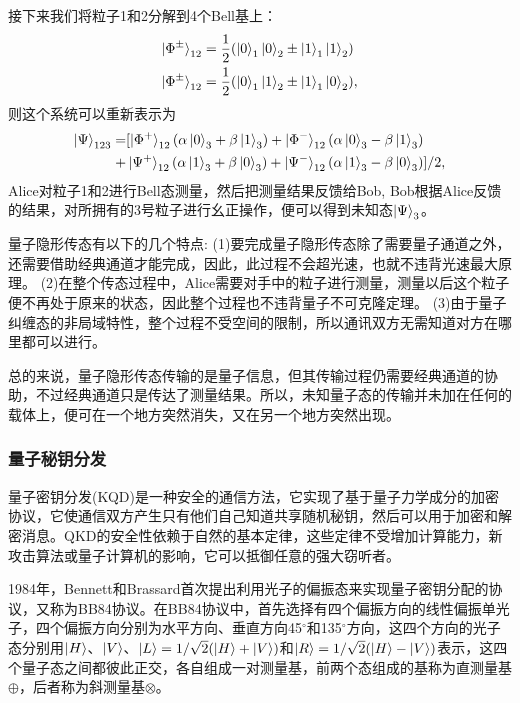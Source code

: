 接下来我们将粒子1和2分解到4个Bell基上：
\begin{equation}
\begin{aligned} 
\ket{\Phi^{\pm}}_{12}&=\frac12(\ket{0}_1\ket{0}_2\pm\ket{1}_1\ket{1}_2)\\
\ket{\Phi^{\pm}}_{12}&=\frac12(\ket{0}_1\ket{1}_2\pm\ket{1}_1\ket{0}_2),
\end{aligned}
\end{equation}
则这个系统可以重新表示为
\begin{equation}
\begin{aligned} 
\ket{\Psi}_{123}=&[\ket{\Phi^{+}}_{12}(\alpha\ket{0}_3+\beta\ket{1}_3)+\ket{\Phi^{-}}_{12}(\alpha\ket{0}_3-\beta\ket{1}_3)\\
                     +&  \ket{\Psi^{+}}_{12}(\alpha\ket{1}_3+\beta\ket{0}_3)+\ket{\Psi^{-}}_{12}(\alpha\ket{1}_3-\beta\ket{0}_3)]/2,
\end{aligned}
\end{equation}
Alice对粒子1和2进行Bell态测量，然后把测量结果反馈给Bob,  Bob根据Alice反馈的结果，对所拥有的3号粒子进行幺正操作，便可以得到未知态$\ket{\Psi}_3$。

量子隐形传态有以下的几个特点:
(1)要完成量子隐形传态除了需要量子通道之外，还需要借助经典通道才能完成，因此，此过程不会超光速，也就不违背光速最大原理。
(2)在整个传态过程中，Alice需要对手中的粒子进行测量，测量以后这个粒子便不再处于原来的状态，因此整个过程也不违背量子不可克隆定理。
(3)由于量子纠缠态的非局域特性，整个过程不受空间的限制，所以通讯双方无需知道对方在哪里都可以进行。

总的来说，量子隐形传态传输的是量子信息，但其传输过程仍需要经典通道的协助，不过经典通道只是传达了测量结果。所以，未知量子态的传输并未加在任何的载体上，便可在一个地方突然消失，又在另一个地方突然出现。
\subsubsection{量子秘钥分发}
量子密钥分发(KQD)是一种安全的通信方法，它实现了基于量子力学成分的加密协议，它使通信双方产生只有他们自己知道共享随机秘钥，然后可以用于加密和解密消息。QKD的安全性依赖于自然的基本定律，这些定律不受增加计算能力，新攻击算法或量子计算机的影响，它可以抵御任意的强大窃听者。

1984年，Bennett和Brassard首次提出利用光子的偏振态来实现量子密钥分配的协议，又称为BB84协议\cite{bennett1984brassard}。在BB84协议中，首先选择有四个偏振方向的线性偏振单光子，四个偏振方向分别为水平方向、垂直方向45$^{\circ}$和135$^{\circ}$方向，这四个方向的光子态分别用$\ket{H}$、$\ket{V}$、$\ket{L}=1/\sqrt{2}(\ket{H}+\ket{V})$和$\ket{R}=1/\sqrt{2}(\ket{H}-\ket{V})$表示，这四个量子态之间都彼此正交，各自组成一对测量基，前两个态组成的基称为直测量基$\oplus$，后者称为斜测量基$\otimes$。

